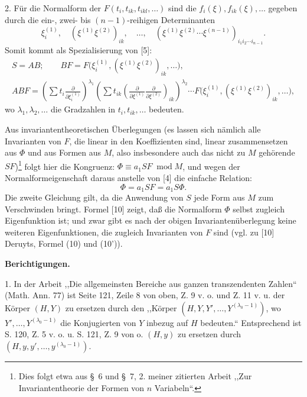 \documentclass[11pt]{article}
\newcommand{\modu}[1]{\;\operatorname{mod} #1}
\providecommand{\p}{\partial}
\providecommand{\p}{\partial}
\providecommand{\modu}[1]{\;\operatorname{mod} #1}
\begin{document}
2. Für die Normalform der $F(t_i,t_{ik},t_{ikl},\ldots)$ sind die $f_i(\xi),f_{ik}(\xi),\ldots$ gegeben durch die ein-, zwei- bis $(n-1)$-reihigen Determinanten
\[
        \xi_i^{(1)},\quad (\xi^{(1)}\xi^{(2)})_{ik},\quad\ldots,\quad
        (\xi^{(1)}\xi^{(2)}\cdots\xi^{(n-1)})_{i_1i_2\cdots i_{n-1}}.
\]
Somit kommt als Spezialisierung von [5]:
\[
\begin{gathered}
        S=AB;\qquad
        BF=F\bigl(\xi_i^{(1)},(\xi^{(1)}\xi^{(2)})_{ik},\ldots\bigr),\\
        ABF=\left(\sum t_i\frac{\p}{\p\xi_i^{(1)}}\right)^{\lambda_1}
        \left(\sum t_{ik}\left(\frac{\p}{\p\xi^{(1)}}\frac{\p}{\p\xi^{(2)}}\right)_{ik}\right)^{\lambda_2}
        \cdots F\bigl(\xi_i^{(1)},(\xi^{(1)}\xi^{(2)})_{ik},\ldots\bigr),
\end{gathered}
\]
wo $\lambda_1,\lambda_2,\ldots$ die Gradzahlen in $t_i,t_{ik},\ldots$ bedeuten.

Aus invariantentheoretischen Überlegungen (es lassen sich nämlich alle Invarianten von $F$, die linear in den Koeffizienten sind, linear zusammensetzen aus $\Phi$ und aus Formen aus $M$, also insbesondere auch das nicht zu $M$ gehörende $SF$)\footnote{Dies folgt etwa aus \S~6 und \S~7, 2. meiner zitierten Arbeit ,,Zur Invariantentheorie der Formen von $n$ Variabeln``.} folgt hier die Kongruenz: $\Phi\equiv a_1SF\modu{M}$, und wegen der Normalformeigenschaft daraus anstelle von [4] die einfache Relation:
\begin{equation}
        \Phi=a_1SF=a_1S\Phi.
\tag{10}
\end{equation}
Die zweite Gleichung gilt, da die Anwendung von $S$ jede Form aus $M$ zum Verschwinden bringt. Formel [10] zeigt, daß die Normalform $\Phi$ selbst zugleich Eigenfunktion ist; und zwar gibt es nach der obigen Invariantenüberlegung keine weiteren Eigenfunktionen, die zugleich Invarianten von $F$ sind (vgl. zu [10] Deruyts, Formel (10) und (10')).

\begin{center}
\textbf{Berichtigungen.}
\end{center}

1. In der Arbeit ,,Die allgemeinsten Bereiche aus ganzen transzendenten Zahlen`` (Math. Ann. 77) ist Seite 121, Zeile 8 von oben, Z. 9 v. o. und Z. 11 v. u. der Körper $(H,Y)$ zu ersetzen durch den ,,Körper $(H,Y,Y',\ldots,Y^{(\lambda_0-1)})$, wo $Y',\ldots,Y^{(\lambda_0-1)}$ die Konjugierten von $Y$ inbezug auf $H$ bedeuten.`` Entsprechend ist S. 120, Z. 5 v. o. u. S. 121, Z. 9 von o. $(H,y)$ zu ersetzen durch $(H,y,y',\ldots,y^{(\lambda_0-1)})$.
\end{document}
